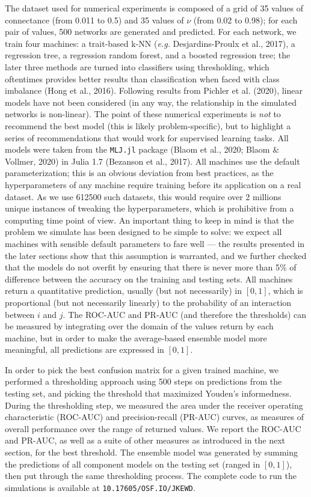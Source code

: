 \documentclass[11pt]{article}
\begin{document}
The dataset used for numerical experiments is composed of a grid of 35
values of connectance (from 0.011 to 0.5) and 35 values of \(\nu\) (from
0.02 to 0.98); for each pair of values, 500 networks are generated and
predicted. For each network, we train four machines: a trait-based k-NN
(\emph{e.g.} Desjardins-Proulx et al., 2017), a regression tree, a
regression random forest, and a boosted regression tree; the later three
methods are turned into classifiers using thresholding, which oftentimes
provides better results than classification when faced with class
imbalance (Hong et al., 2016). Following results from Pichler et al.
(2020), linear models have not been considered (in any way, the
relationship in the simulated networks is non-linear). The point of
these numerical experiments is \emph{not} to recommend the best model
(this is likely problem-specific), but to highlight a series of
recommendations that would work for supervised learning tasks. All
models were taken from the \texttt{MLJ.jl} package (Blaom et al., 2020;
Blaom \& Vollmer, 2020) in Julia 1.7 (Bezanson et al., 2017). All
machines use the default parameterization; this is an obvious deviation
from best practices, as the hyperparameters of any machine require
training before its application on a real dataset. As we use 612500 such
datasets, this would require over 2 millions unique instances of
tweaking the hyperparameters, which is prohibitive from a computing time
point of view. An important thing to keep in mind is that the problem we
simulate has been designed to be simple to solve: we expect all machines
with sensible default parameters to fare well --- the results presented
in the later sections show that this assumption is warranted, and we
further checked that the models do not overfit by ensuring that there is
never more than 5\% of difference between the accuracy on the training
and testing sets. All machines return a quantitative prediction, usually
(but not necessarily) in \([0,1]\), which is proportional (but not
necessarily linearly) to the probability of an interaction between \(i\)
and \(j\). The ROC-AUC and PR-AUC (and therefore the thresholds) can be
measured by integrating over the domain of the values return by each
machine, but in order to make the average-based ensemble model more
meaningful, all predictions are expressed in \([0,1]\).

In order to pick the best confusion matrix for a given trained machine,
we performed a thresholding approach using 500 steps on predictions from
the testing set, and picking the threshold that maximized Youden's
informedness. During the thresholding step, we measured the area under
the receiver operating characteristic (ROC-AUC) and precision-recall
(PR-AUC) curves, as measures of overall performance over the range of
returned values. We report the ROC-AUC and PR-AUC, as well as a suite of
other measures as introduced in the next section, for the best
threshold. The ensemble model was generated by summing the predictions
of all component models on the testing set (ranged in \([0,1]\)), then
put through the same thresholding process. The complete code to run the
simulations is available at \texttt{10.17605/OSF.IO/JKEWD}.
\end{document}
